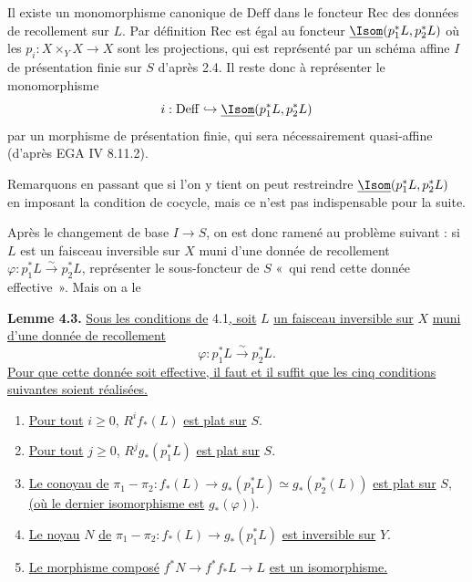 
Il
existe un monomorphisme canonique de \(\mathrm{Deff}\) dans le foncteur \(\mathrm{Rec}\) des données de recollement sur \(L\). Par définition \(\mathrm{Rec}\) est égal au foncteur \(\underline{\Isom}(p_1^*L,p_2^*L)\) où les \(p_i:X\times_YX\to X\) sont les projections, qui est représenté par un schéma affine \(I\) de présentation finie sur \(S\) d'après 2.4. Il reste donc à représenter le monomorphisme
\[
  i:\mathrm{Deff}\hookrightarrow \underline{\Isom}(p_1^*L,p_2^*L)
\]
par un morphisme de présentation finie, qui sera nécessairement quasi-affine (d'après EGA IV 8.11.2).

Remarquons en passant que si l'on y tient on peut restreindre \(\underline{\Isom}(p_1^*L,p_2^*L)\) en imposant la condition de cocycle, mais ce n'est pas indispensable pour la suite.

Après le changement de base \(I\to S\), on est donc ramené au problème suivant : si \(L\) est un faisceau inversible sur \(X\) muni d'une donnée de recollement \(\varphi:p_1^*L\xrightarrow{\sim}p_2^*L\), représenter le sous-foncteur de \(S\) «~qui rend cette donnée effective~». Mais on a le

\textbf{Lemme 4.3.} \uline{Sous les conditions de} 4.1\uline{, soit} \(L\) \uline{un faisceau inversible sur} \(X\) \uline{muni d'une donnée de recollement}
\[
  \varphi:p_1^*L\xrightarrow{\sim}p_2^*L.
\]
\uline{Pour que cette donnée soit effective, il faut et il suffit que les cinq conditions suivantes soient réalisées.}
\begin{enumerate}[label=\arabic*)]
\item \uline{Pour tout} \(i\ge0\), \(R^if_*(L)\) \uline{est plat sur} \(S\).
\item \uline{Pour tout} \(j\ge0\), \(R^jg_*(p_1^*L)\) \uline{est plat sur} \(S\).
\item \uline{Le conoyau de} \(\pi_1-\pi_2:f_*(L)\longrightarrow g_*(p_1^*L)\simeq g_*(p_2^*(L))\) \uline{est plat sur} \(S\)\uline{, (où le dernier isomorphisme est} \(g_*(\varphi)\)).
\item \uline{Le noyau} \(N\) \uline{de} \(\pi_1-\pi_2:f_*(L)\to g_*(p_1^*L)\) \uline{est inversible sur} \(Y\).
\item \uline{Le morphisme composé} \(f^*N\to f^*f_*L\to L\) \uline{est un isomorphisme.}
\end{enumerate}

